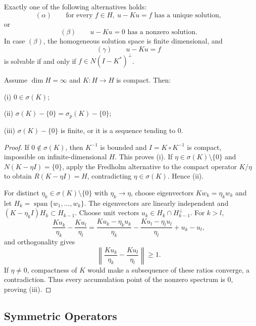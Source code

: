 \begin{remark}
\label{rem:fredholm-alternative-dichotomy}
Exactly one of the following alternatives holds:
\[
(\alpha)\qquad
\text{for every }f\in H,\ u-Ku=f
\text{ has a unique solution},
\]
or
\[
(\beta)\qquad
u-Ku=0\text{ has a nonzero solution}.
\]
In case $(\beta)$, the homogeneous solution space is finite dimensional, and
\[
(\gamma)\qquad u-Ku=f
\]
is solvable if and only if $f\in N(I-K^*)^\perp$.
\end{remark}

\begin{theorem}
\label{thm:spectrum-of-compact-operator}
Assume $\dim H=\infty$ and $K:H\to H$ is compact. Then:

(i) $0\in\sigma(K)$;

(ii) $\sigma(K)-\{0\}=\sigma_p(K)-\{0\}$;

(iii) $\sigma(K)-\{0\}$ is finite, or it is a sequence tending to $0$.
\end{theorem}
\begin{proof}
\sketch If $0\notin\sigma(K)$, then $K^{-1}$ is bounded and $I=K\circ K^{-1}$ is compact, impossible on infinite-dimensional $H$. This proves (i). If $\eta\in\sigma(K)\setminus\{0\}$ and $N(K-\eta I)=\{0\}$, apply the Fredholm alternative to the compact operator $K/\eta$ to obtain $R(K-\eta I)=H$, contradicting $\eta\in\sigma(K)$. Hence (ii).

For distinct $\eta_k\in\sigma(K)\setminus\{0\}$ with $\eta_k\to\eta$, choose eigenvectors $Kw_k=\eta_kw_k$ and let $H_k=\operatorname{span}\{w_1,\ldots,w_k\}$. The eigenvectors are linearly independent and $(K-\eta_kI)H_k\subset H_{k-1}$. Choose unit vectors $u_k\in H_k\cap H_{k-1}^\perp$. For $k>l$,
\[
\frac{Ku_k}{\eta_k}-\frac{Ku_l}{\eta_l}
=\frac{Ku_k-\eta_ku_k}{\eta_k}
-\frac{Ku_l-\eta_lu_l}{\eta_l}
+u_k-u_l,
\]
and orthogonality gives
\[
\left\|\frac{Ku_k}{\eta_k}-\frac{Ku_l}{\eta_l}\right\|\geq1.
\]
If $\eta\ne0$, compactness of $K$ would make a subsequence of these ratios converge, a contradiction. Thus every accumulation point of the nonzero spectrum is $0$, proving (iii).
\end{proof}

\subsection{Symmetric Operators}
\label{sec:symmetric-operators}

